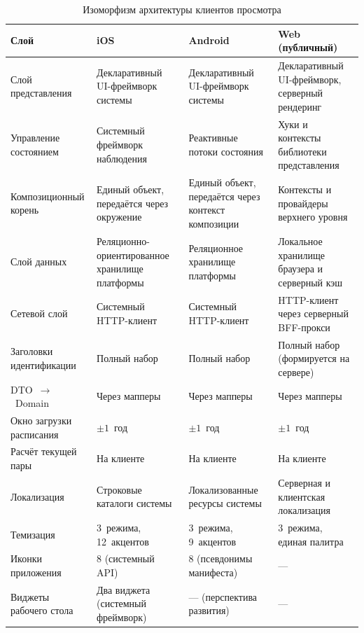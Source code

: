 \begin{table}[h]
  \caption{Изоморфизм архитектуры клиентов просмотра}
  \label{tab:cross-platform-isomorphism}
  \centering
  \small
  \begin{tabular}{p{} p{} p{} p{}}
    \toprule
    Слой & iOS & Android & Web (публичный) \\
    \midrule
    Слой представления          & Декларативный UI-фреймворк системы & Декларативный UI-фреймворк системы & Декларативный UI-фреймворк, серверный рендеринг \\
    Управление состоянием       & Системный фреймворк наблюдения & Реактивные потоки состояния & Хуки и контексты библиотеки представления \\
    Композиционный корень       & Единый объект, передаётся через окружение & Единый объект, передаётся через контекст композиции & Контексты и провайдеры верхнего уровня \\
    Слой данных                 & Реляционно-ориентированное хранилище платформы & Реляционное хранилище платформы & Локальное хранилище браузера и серверный кэш \\
    Сетевой слой                & Системный HTTP-клиент & Системный HTTP-клиент & HTTP-клиент через серверный BFF-прокси \\
    Заголовки идентификации     & Полный набор & Полный набор & Полный набор (формируется на сервере) \\
    DTO~$\to$~Domain            & Через мапперы & Через мапперы & Через мапперы \\
    Окно загрузки расписания    & $\pm 1$~год & $\pm 1$~год & $\pm 1$~год \\
    Расчёт текущей пары         & На клиенте & На клиенте & На клиенте \\
    Локализация                 & Строковые каталоги системы & Локализованные ресурсы системы & Серверная и клиентская локализация \\
    Темизация                   & 3~режима, 12~акцентов & 3~режима, 9~акцентов & 3~режима, единая палитра \\
    Иконки приложения           & 8 (системный API) & 8 (псевдонимы манифеста) & --- \\
    Виджеты рабочего стола      & Два виджета (системный фреймворк) & --- (перспектива развития) & --- \\
    \bottomrule
  \end{tabular}
\end{table}

